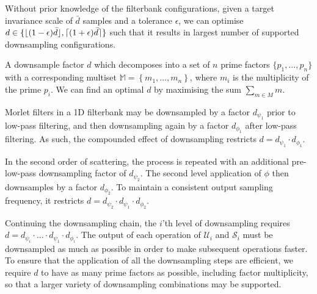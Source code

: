 Without prior knowledge of the filterbank configurations, given a target invariance scale of $\bar{d}$ samples and a tolerance $\epsilon$, we can optimise $d \in \{\lfloor(1 - \epsilon)\bar{d}\rfloor, \lceil(1 + \epsilon)\bar{d}\rceil\}$ such that it results in largest number of supported downsampling configurations.

A downsample factor $d$ which decomposes into a set of $n$ prime factors $\{p_1, ..., p_n\}$ with a corresponding multiset $\mathbb{M} = \left\{ m_1, ..., m_n \right\}$, where $m_i$ is the multiplicity of the prime $p_i$. We can find an optimal $d$ by maximising the sum $\sum\limits_{m \in M} m$.


Morlet filters in a 1D filterbank may be downsampled by a factor $d_{\psi_1}$ prior to low-pass filtering, and then downsampling again by a factor $d_{\phi_1}$ after low-pass filtering. As such, the compounded effect of downsampling restricts $d = d_{\psi_1} \cdot d_{\phi_1}$.

In the second order of scattering, the process is repeated with an additional pre-low-pass downsampling factor of $d_{\psi_2}$. The second level application of $\phi$ then downsamples by a factor $d_{\phi_2}$. To maintain a consistent output sampling frequency, it restricts $d = d_{\psi_2} \cdot d_{\psi_1} \cdot d_{\phi_2}$. 

Continuing the downsampling chain, the $i$'th level of downsampling requires $d = d_{\psi_i} \cdot ... \cdot d_{\psi_1} \cdot d_{\phi_i}$. The output of each operation of $\mathcal{U}_i$ and $\mathcal{S}_i$ must be downsampled as much as possible in order to make subsequent operations faster. To ensure that the application of all the downsampling steps are efficient, we require $d$ to have as many prime factors as possible, including factor multiplicity, so that a larger variety of downsampling combinations may be supported.





